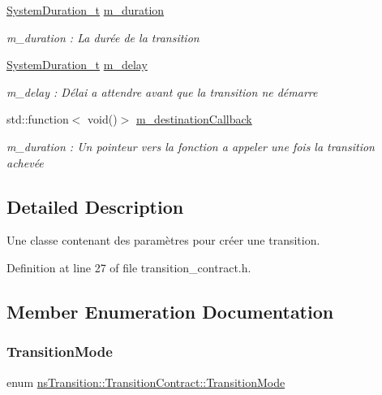 \begin{DoxyCompactItemize}
\hyperlink{namespacens_transition_a260258f249f46ff9a62da721537f87af}{System\+Duration\+\_\+t} \hyperlink{classns_transition_1_1_transition_contract_a0c8ac97863022965d6ac0539d972c325}{m\+\_\+duration}
\begin{DoxyCompactList}\small\item\em m\+\_\+duration \+: La durée de la transition \end{DoxyCompactList}\item 
\hyperlink{namespacens_transition_a260258f249f46ff9a62da721537f87af}{System\+Duration\+\_\+t} \hyperlink{classns_transition_1_1_transition_contract_a5c317b573104f3d3c9caafbc3014ac16}{m\+\_\+delay}
\begin{DoxyCompactList}\small\item\em m\+\_\+delay \+: Délai a attendre avant que la transition ne démarre \end{DoxyCompactList}\item 
std\+::function$<$ void()$>$ \hyperlink{classns_transition_1_1_transition_contract_ac95072df084f1edbd63479c68228b9d6}{m\+\_\+destination\+Callback}
\begin{DoxyCompactList}\small\item\em m\+\_\+duration \+: Un pointeur vers la fonction a appeler une fois la transition achevée \end{DoxyCompactList}\end{DoxyCompactItemize}


\subsection{Detailed Description}
Une classe contenant des paramètres pour créer une transition. 

Definition at line 27 of file transition\+\_\+contract.\+h.



\subsection{Member Enumeration Documentation}
\mbox{\label{classns_transition_1_1_transition_contract_a40118ebf3c1a0a486934ce2b9ddc3edb}} 
\subsubsection{\texorpdfstring{Transition\+Mode}{TransitionMode}}
{\footnotesize\ttfamily enum \hyperlink{classns_transition_1_1_transition_contract_a40118ebf3c1a0a486934ce2b9ddc3edb}{ns\+Transition\+::\+Transition\+Contract\+::\+Transition\+Mode}}



